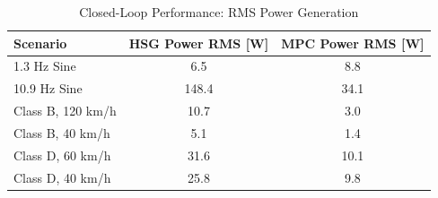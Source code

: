 \begin{table}[H]
    \centering
    \caption{Closed-Loop Performance: RMS Power Generation}
    \label{tab:cl_power_metrics}
    \renewcommand{\arraystretch}{1.2}
    \begin{tabular}{lcc}
        \toprule
        \textbf{Scenario} & \textbf{HSG Power RMS} [W] & \textbf{MPC Power RMS} [W] \\
        \midrule
        1.3 Hz Sine      & 6.5   & 8.8  \\
        10.9 Hz Sine     & 148.4 & 34.1 \\
        Class B, 120 km/h& 10.7  & 3.0  \\
        Class B, 40 km/h & 5.1   & 1.4  \\
        Class D, 60 km/h & 31.6  & 10.1 \\
        Class D, 40 km/h & 25.8  & 9.8  \\
        \bottomrule
    \end{tabular}
\end{table}